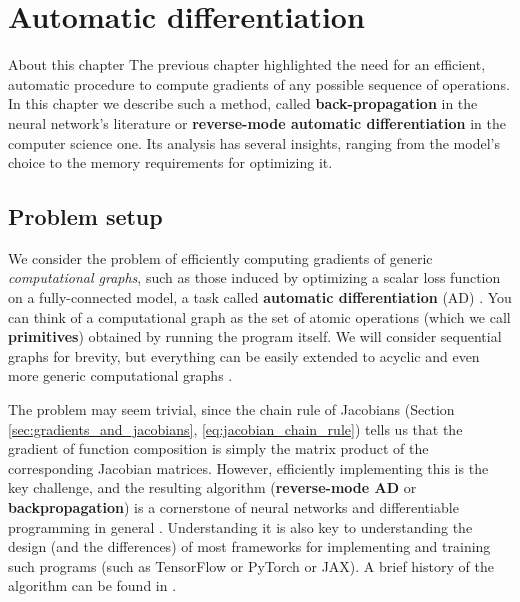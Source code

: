 \chapter{Automatic differentiation}
\label{chap:automatic_differentiation}

\begin{supportbox}{About this chapter}
The previous chapter highlighted the need for an efficient, automatic procedure to compute gradients of any possible sequence of operations. In this chapter we describe such a method, called \textbf{back-propagation} in the neural network’s literature or \textbf{reverse-mode automatic differentiation} in the computer science one. Its analysis has several insights, ranging from the model's choice to the memory requirements for optimizing it.
\end{supportbox}

\section{Problem setup}

We consider the problem of efficiently computing gradients of generic \textit{computational graphs}, such as those induced by optimizing a scalar loss function on a fully-connected model, a task called \textbf{automatic differentiation} (AD) \cite{baydin2018automatic}. You can think of a computational graph as the set of atomic operations (which we call \textbf{primitives}) obtained by running the program itself. We will consider sequential graphs for brevity, but everything can be easily extended to acyclic and even more generic computational graphs \cite{griewank2008evaluating,blondel2024elements} .

The problem may seem trivial, since the chain rule of Jacobians (Section \ref{sec:gradients_and_jacobians}, \eqref{eq:jacobian_chain_rule}) tells us that the gradient of function composition is simply the matrix product of the corresponding Jacobian matrices. However, efficiently implementing this is the key challenge, and the resulting algorithm (\textbf{reverse-mode AD} or \textbf{backpropagation}) is a cornerstone of neural networks and differentiable programming in general \cite{griewank2008evaluating,blondel2024elements}. Understanding it is also key to understanding the design (and the differences) of most frameworks for implementing and training such programs (such as TensorFlow or PyTorch or JAX). A brief history of the algorithm can be found in \cite{griewank2012invented}.

